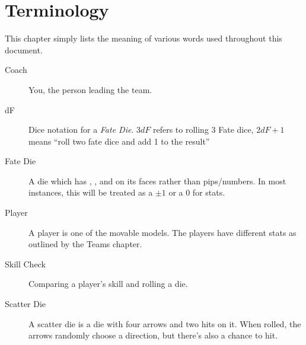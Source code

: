 \chapter{Terminology}
This chapter simply lists the meaning of various words used throughout this document.

\begin{description}
\item[Coach] You, the person leading the team.
\item[dF] Dice notation for a \textit{Fate Die}. 
$3dF$ refers to rolling 3 Fate dice, $2dF+1$ means ``roll two fate dice and add 1 to the result''
\item[Fate Die] A die which has \plus{}, \minus{}, and \blank{} on its faces rather than pips/numbers.
In most instances, this will be treated as a $\pm 1$ or a 0 for stats.
\item[Player] A player is one of the movable models.
The players have different stats as outlined by the Teams chapter.
\item[Skill Check] Comparing a player's skill and rolling a \fate{} die.
\item[Scatter Die] A scatter die is a die with four arrows and two hits on it. When rolled, the arrows randomly choose a direction, but there's also a chance to hit.
\end{description}